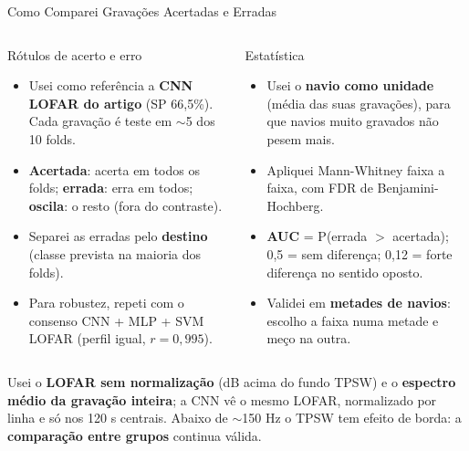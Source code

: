 \documentclass[aspectratio=169]{beamer}
\begin{document}
\begin{frame}{Como Comparei Gravações Acertadas e Erradas}
    \footnotesize
    \begin{columns}[t]
        \begin{block}{\small Rótulos de acerto e erro}
            \scriptsize
            \begin{itemize}
                \setlength{\itemsep}{1pt}
                \item Usei como referência a \textbf{CNN LOFAR do artigo} (SP 66,5\%). Cada gravação é teste em $\sim$5 dos 10 folds.
                \item \textbf{Acertada}: acerta em todos os folds; \textbf{errada}: erra em todos; \textbf{oscila}: o resto (fora do contraste).
                \item Separei as erradas pelo \textbf{destino} (classe prevista na maioria dos folds).
                \item Para robustez, repeti com o consenso CNN + MLP + SVM LOFAR (perfil igual, $r = 0{,}995$).
            \end{itemize}
        \end{block}
        \begin{block}{\small Estatística}
            \scriptsize
            \begin{itemize}
                \setlength{\itemsep}{1pt}
                \item Usei o \textbf{navio como unidade} (média das suas gravações), para que navios muito gravados não pesem mais.
                \item Apliquei Mann-Whitney faixa a faixa, com FDR de Benjamini-Hochberg.
                \item \textbf{AUC} = P(errada $>$ acertada); 0,5 = sem diferença; 0,12 = forte diferença no sentido oposto.
                \item Validei em \textbf{metades de navios}: escolho a faixa numa metade e meço na outra.
            \end{itemize}
        \end{block}
    \end{columns}
    \vspace{0.05cm}
    {\scriptsize Usei o \textbf{LOFAR sem normalização} (dB acima do fundo TPSW) e o \textbf{espectro médio da gravação inteira}; a CNN vê o mesmo LOFAR, normalizado por linha e só nos 120 s centrais. Abaixo de $\sim$150 Hz o TPSW tem efeito de borda: a \textbf{comparação entre grupos} continua válida.\par}
\end{frame}
\end{document}
